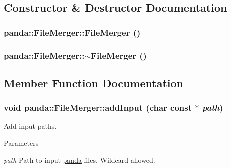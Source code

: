 \subsection{Constructor \& Destructor Documentation}
\hypertarget{classpanda_1_1FileMerger_ad3cf13a7f570d6bdf73e5332d72c7e23}{
\subsubsection[{FileMerger}]{\setlength{\rightskip}{0pt plus 5cm}panda::FileMerger::FileMerger ()}}
\label{classpanda_1_1FileMerger_ad3cf13a7f570d6bdf73e5332d72c7e23}
\hypertarget{classpanda_1_1FileMerger_aadf13463fd306f689eb10abe1ea5cc49}{
\subsubsection[{$\sim$FileMerger}]{\setlength{\rightskip}{0pt plus 5cm}panda::FileMerger::$\sim$FileMerger ()}}
\label{classpanda_1_1FileMerger_aadf13463fd306f689eb10abe1ea5cc49}


\subsection{Member Function Documentation}
\hypertarget{classpanda_1_1FileMerger_a6725e20df5ca4795d030bfb7e274d1c0}{
\subsubsection[{addInput}]{\setlength{\rightskip}{0pt plus 5cm}void panda::FileMerger::addInput (char const $\ast$ {\em path})}}
\label{classpanda_1_1FileMerger_a6725e20df5ca4795d030bfb7e274d1c0}


Add input paths. 
\begin{DoxyParams}{Parameters}
\item[{\em path}]Path to input \hyperlink{namespacepanda}{panda} files. Wildcard allowed. \end{DoxyParams}


